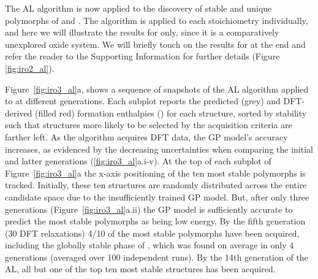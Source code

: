 %



%
The AL algorithm is now applied to the discovery of stable and unique polymorphs of \IrOtwo and \IrOthree. The algorithm is applied to each stoichiometry individually,
and here we will illustrate the results for \IrOthree only,
since it is a comparatively unexplored oxide system.
%
We will briefly touch on the results for \IrOtwo at the end and refer the reader to the Supporting Information for further details (Figure \ref{fig:iro2_al}).


%
%
Figure~\ref{fig:iro3_al}a, shows a sequence of snapshots of the AL algorithm applied to \IrOthree at different generations.
%
Each subplot reports the predicted (grey) and DFT-derived (filled red) formation enthalpies (\DHf) for each structure, sorted by stability such that structures more likely to be selected by the acquisition criteria are farther left.
%
As the algorithm acquires DFT data, the GP model's accuracy increases,
as evidenced by the decreasing uncertainties when comparing the initial and latter generations (\ref{fig:iro3_al}a.i-v).
%
At the top of each subplot of Figure~\ref{fig:iro3_al}a the x-axis positioning of the ten most stable polymorphs is tracked.
%
Initially, these ten structures are randomly distributed across the entire candidate space due to the insufficiently trained GP model.
%
But, after only three generations (Figure~\ref{fig:iro3_al}a.ii) the GP model is sufficiently accurate to predict the most stable polymorphs as being low energy.
%
By the fifth generation (\num{30} DFT relaxations) \num{4/10} of the most stable polymorphs have been acquired,
including the globally stable phase of \IrOthree, which
was found on average in only 4 generations (averaged over 100 independent runs).
%
By the 14th generation of the AL,
all but one of the top ten most stable structures has been acquired.


